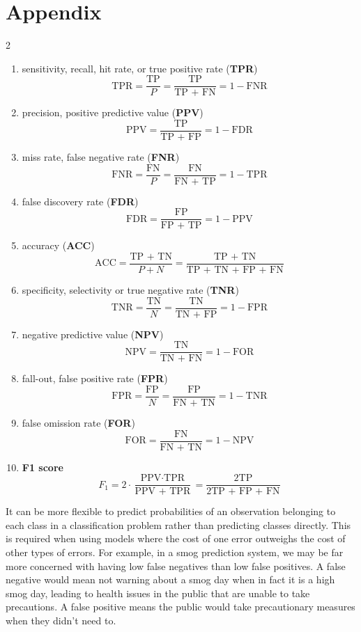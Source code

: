 \documentclass[11pt]{article}
\newcommand{\ulb}{\begin{enumerate}[label=\textbullet,topsep=0pt,itemsep=-0.5ex,partopsep=1ex,parsep=1ex]}
\newcommand{\ule}{\end{enumerate}\vspace{1mm}}
\newcommand{\mcb}[1]{\begin{multicols}{#1}}
\newcommand{\mce}{\end{multicols}\noindent}
\begin{document}
\section{Appendix}
\vspace{-0.5cm}
\begin{small}
\mcb{2}
\ulb
\item sensitivity, recall, hit rate, or true positive rate (\textbf{TPR})
$$ \text{TPR} = \frac{\text{TP}}{P} = \frac{\text{TP}}{\text{TP + FN}} = 1 - \text{FNR} $$

\item precision, positive predictive value (\textbf{PPV})
$$ \text{PPV} = \frac{\text{TP}}{\text{TP + FP}} = 1 - \text{FDR} $$

\item miss rate, false negative rate (\textbf{FNR})
$$ \text{FNR} = \frac{\text{FN}}{P} = \frac{\text{FN}}{\text{FN + TP}} = 1 - \text{TPR} $$

\item false discovery rate (\textbf{FDR})
$$ \text{FDR} = \frac{\text{FP}}{\text{FP + TP}} = 1 - \text{PPV} $$

\item accuracy (\textbf{ACC})
$$ \text{ACC} = \frac{\text{TP + TN}}{P + N} = \frac{\text{TP + TN}}{\text{TP + TN + FP + FN}} $$

\item specificity, selectivity or true negative rate (\textbf{TNR})
$$ \text{TNR} = \frac{\text{TN}}{N} = \frac{\text{TN}}{\text{TN + FP}} = 1 - \text{FPR} $$

\item negative predictive value (\textbf{NPV})
$$ \text{NPV} = \frac{\text{TN}}{\text{TN + FN}} = 1 - \text{FOR} $$

\item fall-out, false positive rate (\textbf{FPR})
$$ \text{FPR} = \frac{\text{FP}}{N} = \frac{\text{FP}}{\text{FN + TN}} = 1 - \text{TNR} $$

\item false omission rate (\textbf{FOR})
$$ \text{FOR} = \frac{\text{FN}}{\text{FN + TN}} = 1 - \text{NPV} $$

\item \textbf{F1 score}
$$ F_1 = 2 \cdot \frac{\text{PPV} \cdot \text{TPR}}{\text{PPV + TPR}} = \frac{\text{2TP}}{\text{2TP + FP + FN}} $$

\ule
\mce
\end{small}
\vspace{-0.5cm}
\par It can be more flexible to predict probabilities of an observation belonging to each class in a classification problem rather than predicting classes directly. This is required when using models where the cost of one error outweighs the cost of other types of errors. For example, in a smog prediction system, we may be far more concerned with having low false negatives than low false positives. A false negative would mean not warning about a smog day when in fact it is a high smog day, leading to health issues in the public that are unable to take precautions. A false positive means the public would take precautionary measures when they didn't need to.
\end{document}
